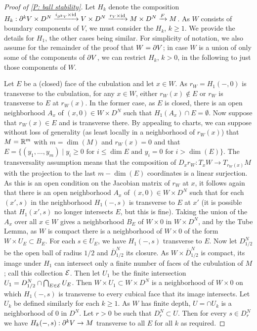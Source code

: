 \begin{proof}[Proof of \cref{P: ball stability}]
Let $H_k$ denote the composition $H_k:\partial^kV\times D^N\xrightarrow{i_{\partial^kV}\times \mathrm{id}}V\times D^N\xrightarrow{r_V\times \mathrm{id}} M\times D^N\xrightarrow{F} M$.
 As $W$ consists of boundary components of $V$, we must  consider the $H_k$, $k\geq 1$. We provide the details for $H_1$, the other cases being similar.
 For simplicity of notation, we also assume for the remainder of the proof that $W=\partial V$; in case $W$ is a union of only some of the components of $\partial V$, we can restrict $H_k$, $k>0$, in the following to just those components of $W$. 

 Let $E$ be a (closed) face of the cubulation and let $x\in W$.  As $r_W=H_1(-,0)$ is transverse to the cubulation, for any $x\in W$, either $r_W(x)\notin E$ or $r_W$ is transverse to $E$ at $r_W(x)$. In the former case, as $E$ is closed, there is an open neighborhood $A_x$ of $(x,0)\in W\times D^N$ such that $H_1(A_x)\cap E=\emptyset$. Now suppose that $r_W(x)\in E$ and is transverse there. By appealing to charts, we can suppose without loss of generality  (as least locally in a neighborhood of $r_W(x)$) that $M=\mathbb{R}^m$ with $m=\dim(M)$ and $r_W(x)=0$ and that $E=\{(y_1,\ldots,y_m)\mid y_i\geq 0\text{ for } i\leq \dim E\text{ and } y_i=0 \text{ for } i>\dim(E)\}$. The transversality assumption means that the composition of $D_xr_W :T_xW\to T_{r_W(x)}M$ with the projection to the last $m-\dim(E)$ coordinates is a linear surjection. As this is an open condition on the Jacobian matrix of $r_W$ at $x$, it follows again that there is an open neighborhood $A_x$ of $(x,0)\in W\times D^N$ such that for each $(x',s)$ in the neighborhood $H_1(-,s)$ is transverse to $E$ at $x'$ (it is possible that $H_1(x',s)$ no longer intersects $E$, but this is fine). Taking the union of the $A_x$ over all $x\in W$ gives a neighborhood $B_E$ of $W\times 0$ in $W\times D^N$, and by the Tube Lemma, as $W$ is compact there is a neighborhood of $W\times 0$ of the form $W\times U_E\subset B_E$. For each $s\in U_E$, we have $H_1(-,s)$ transverse to $E$. 
Now let $D^N_{1/2}$ be the open ball of radius $1/2$ and $\bar D^N_{1/2}$ its closure. 
As $W\times \bar D^N_{1/2}$ is compact, its image under $H_1$ can intersect only a finite number of faces of the cubulation of $M$; call this collection $\mathcal{E}$. Then let $U_1$ be the finite intersection $U_1=D^N_{1/2}\cap \bigcap_{E\in\mathcal{E}} U_E$. Then $W\times U_1\subset W\times D^N$ is a neighborhood of $W\times 0$ on which $H_1(-,s)$ is transverse to every cubical face that its image intersects. Let $U_k$ be defined similarly for each $k\geq 1$. As $W$ has finite depth, $U=\cap U_k$ is a neighborhood of $0$ in $D^N$. Let $r>0$ be such that $D^N_r\subset U$. Then for every $s\in D^N_r$ we have $H_k(-,s):\partial^kV\to M$ transverse to all $E$ for all $k$ as required. 


\end{proof}
